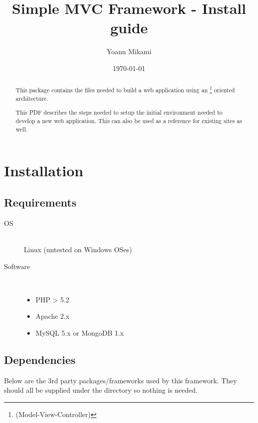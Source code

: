 \documentclass[pdftex,12pt,a4paper]{article}
\begin{document}
\title{Simple MVC Framework - Install guide}
\author{Yoann Mikami}
\date{\today}
\maketitle

\begin{abstract}
This package contains the files needed to build a web application using
an \footnote{(Model-View-Controller)} oriented architecture.

This PDF describes the steps needed to setup the initial environment needed
to develop a new web application. This can also be used as a reference for existing sites as well.
\end{abstract}

\tableofcontents

\cleardoublepage

\section{Installation}

\subsection{Requirements}

\begin{description}
    \item[OS] \hfill \\
    Linux (untested on Windows OSes)
    \item[Software] \hfill \\
    \begin{itemize}
        \item PHP \textgreater{} 5.2
        \item Apache 2.x
        \item MySQL 5.x or MongoDB 1.x
    \end{itemize}
\end{description}

\subsection{Dependencies}
Below are the 3rd party packages/frameworks used by this framework.
They should all be supplied under the  directory so nothing is needed.
\end{document}

